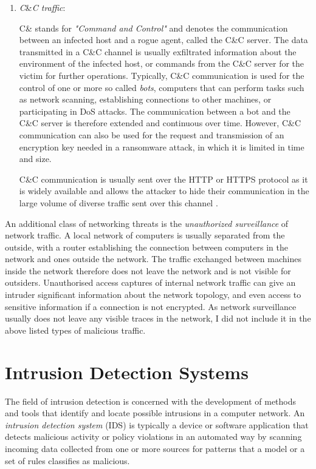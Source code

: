 \documentclass[a4paper,12pt,twoside]{report}
\begin{document}
\begin{enumerate}
\item \textit{C}\&\textit{C traffic}: 

C\& stands for \textit{"Command and Control"} and denotes the communication between an infected host and a rogue agent, called the C\&C server. The data transmitted in a C\&C channel is usually exfiltrated information about the environment of the infected host, or commands from the C\&C server for the victim for further operations. Typically, C\&C communication is used for the control of one or more so called \textit{bots}, computers that can perform tasks such as network scanning, establishing connections to other machines, or participating in DoS attacks. The communication between a bot and the C\&C server is therefore extended and continuous over time. However, C\&C communication can also be used for the request and transmission of an encryption key needed in a ransomware attack, in which it is limited in time and size. 

C\&C communication is usually sent over the HTTP or HTTPS protocol as it is widely available and allows the attacker to hide their communication in the large volume of diverse traffic sent over this channel \cite{lamprakis2017unsupervised}.

\end{enumerate}

An additional class of networking threats is the \textit{unauthorized surveillance} of network traffic. A local network of computers is usually separated from the outside, with a router establishing the connection between computers in the network and ones outside the network. The traffic exchanged between machines inside the network therefore does not leave the network and is not visible for outsiders. Unauthorised access captures of internal network traffic can give an intruder significant information about the network topology, and even access to sensitive information if a connection is not encrypted. As network surveillance usually does not leave any visible traces in the network, I did not include it in the above listed types of malicious traffic. 


\section{Intrusion Detection Systems}

The field of intrusion detection is concerned with the development of methods and tools that identify and locate possible intrusions in a computer network. An \textit{intrusion detection system} (IDS) is typically a device or software application that detects malicious activity or policy violations in an automated way by scanning incoming data collected from one or more sources for patterns that a model or a set of rules classifies as malicious.
\end{document}
